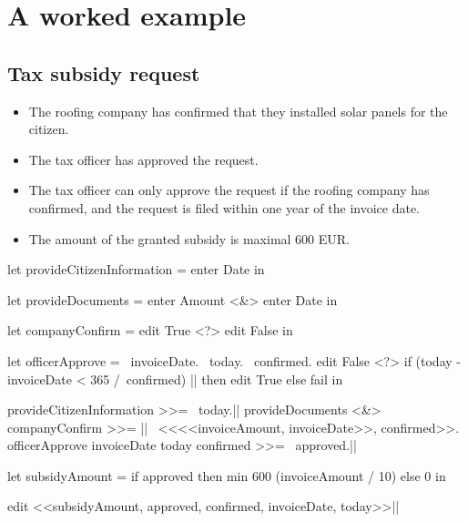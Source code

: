 
\section{A worked example}
\label{sec:examples}

\subsection{Tax subsidy request}

%
\begin{itemize}
\item The roofing company has confirmed that they installed solar panels for the citizen.
\item The tax officer has approved the request.
\item The tax officer can only approve the request if the roofing company has confirmed, and the request is filed within one year of the invoice date.
\item The amount of the granted subsidy is maximal 600 EUR.
\end{itemize}

\begin{TASK}[float=ht
            ,numbers=right
            ,caption=Subsidy request and approval workflow at the Dutch tax office.
            ,label=lst:tax
            ]
  let provideCitizenInformation = enter Date in

    let provideDocuments = enter Amount <&> enter Date in

      let companyConfirm = edit True <?> edit False in

        let officerApprove = \ invoiceDate. \ today. \ confirmed.
          edit False <?> if (today - invoiceDate < 365 /\ confirmed) |\label{lst:tax:officer-approve-def}| then edit True else fail in

            provideCitizenInformation >>= \ today.|\label{lst:tax:citizen-info}|
            provideDocuments <&> companyConfirm >>= |\label{lst:tax:documents-and-company-confirm}|
              \ <<<<invoiceAmount, invoiceDate>>, confirmed>>.
              officerApprove invoiceDate today confirmed >>= \ approved.|\label{lst:tax:officer-approve}|

          let subsidyAmount = if approved then min 600 (invoiceAmount / 10) else 0 in
          
            edit <<subsidyAmount, approved, confirmed, invoiceDate, today>>|\label{lst:tax:result}|
\end{TASK}

